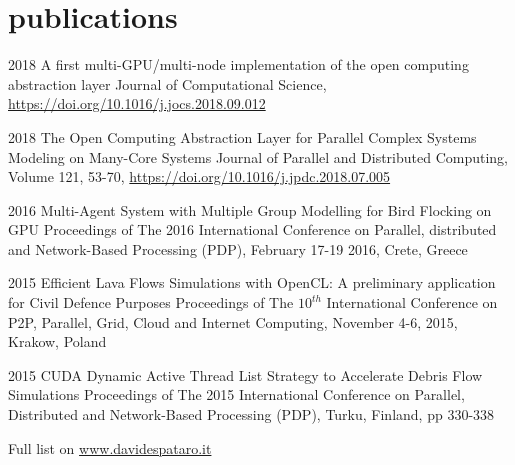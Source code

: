 \documentclass[]{twentysecondscv}
\begin{document}
\section{publications}
\begin{twenty}
    \twentyitem
    {2018}
    {A first multi-GPU/multi-node implementation of the open computing abstraction layer}
    {}
    {\footnotesize{Journal of Computational Science, \url{https://doi.org/10.1016/j.jocs.2018.09.012}}}

    \twentyitem
    {2018}
    {The Open Computing Abstraction Layer for Parallel Complex Systems Modeling on Many-Core Systems}
    {}
    {\footnotesize{Journal of Parallel and Distributed Computing, Volume 121, 53-70, \url{https://doi.org/10.1016/j.jpdc.2018.07.005}}} 
    
    \twentyitem
    {2016}
    {Multi-Agent System with Multiple Group Modelling for Bird Flocking on GPU}
    {}
    {\footnotesize{Proceedings of The 2016 International Conference on Parallel, distributed and Network-Based Processing (PDP), February 17-19 2016, Crete, Greece}}
    
    
    \twentyitem
    {2015}
    {Efficient Lava Flows Simulations with OpenCL: A preliminary application for Civil Defence Purposes}
    {}
    {\footnotesize{Proceedings of The $10^{th}$ International Conference on P2P, Parallel, Grid, Cloud and Internet Computing, November 4-6, 2015, Krakow, Poland}}
     
    \twentyitem 
    {2015}
    {CUDA Dynamic Active Thread List Strategy to Accelerate Debris Flow Simulations}
    {}
    {\footnotesize{Proceedings of The 2015 International Conference on Parallel, Distributed and Network-Based Processing (PDP), Turku, Finland, pp 330-338}}

\end{twenty}
Full list on \url{www.davidespataro.it}




\end{document}
